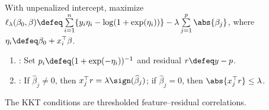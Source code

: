 \begin{method} \label{meth:sl-l1-logistic-regression} \\
With unpenalized intercept, maximize $\ell_\lambda(\beta_0,\beta)\defeq\sum\limits_{i=1}^{n}\{y_i\eta_i-\log(1+\exp(\eta_i))\}-\lambda\sum\limits_{j=1}^{p}\abs{\beta_j}$, where $\eta_i\defeq\beta_0+x_i^\top\beta$.
\begin{enumerate}[label=(\roman*)]
\setlength{\itemsep}{0pt}
\item {}: Set $p_i\defeq(1+\exp(-\eta_i))^{-1}$ and residual $r\defeq y-p$.
\item {}: If $\widehat{\beta}_j\neq0$, then $x_j^\top r=\lambda\sign(\widehat{\beta}_j)$; if $\widehat{\beta}_j=0$, then $\abs{x_j^\top r}\leq\lambda$.
\end{enumerate}
The KKT conditions are thresholded feature--residual correlations.
\end{method}
